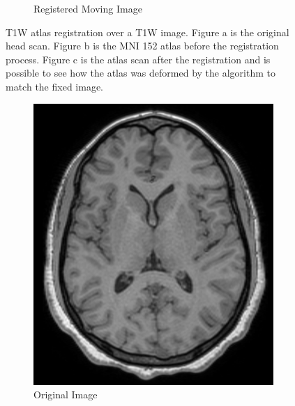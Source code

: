 \documentclass{standalone}
\begin{document}
\begin{figure}[h!]
\begin{subfigure}[b]{0.325\textwidth}
             \caption{Registered Moving Image}
             \label{fig:registered_mni}
        \end{subfigure}
		\caption{T1W atlas registration over a T1W image. Figure a is the original head scan. Figure b is the MNI 152 \cite{MNI152_09a} atlas before the registration process. Figure c is the atlas scan after the registration and is possible to see how the atlas was deformed by the algorithm to match the fixed image.}
		\label{fig:atlas_registration}
	\end{figure} 


\begin{figure}[h!]
		\centering
        \begin{subfigure}[b]{0.325\textwidth}
             \includegraphics[scale=0.105]{img/Chap2/T1.jpg}
             \caption{Original Image}
             \label{fig:T1_brain}
        \end{subfigure}
        \hfill
        \begin{subfigure}[b]{0.325\textwidth}

\end{subfigure}
\end{figure}
\end{document}
